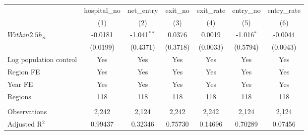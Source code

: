 \begingroup
\centering
\begin{tabular}{lcccccc}
   \toprule
                          & hospital\_no  & net\_entry    & exit\_no  & exit\_rate  & entry\_no    & entry\_rate \\    
                          & (1)           & (2)           & (3)       & (4)         & (5)          & (6)\\  
   \midrule 
   $Within2.5h_{it}$      & -0.0181       & -1.041$^{**}$ & 0.0376    & 0.0019      & -1.016$^{*}$ & -0.0044\\   
                          & (0.0199)      & (0.4371)      & (0.3718)  & (0.0033)    & (0.5794)     & (0.0043)\\   
   Log population control & Yes           & Yes           & Yes       & Yes         & Yes          & Yes\\  
   Region FE              & Yes           & Yes           & Yes       & Yes         & Yes          & Yes\\  
   Year FE                & Yes           & Yes           & Yes       & Yes         & Yes          & Yes\\  
   Regions                & 118           & 118           & 118       & 118         & 118          & 118\\  
    \\
   Observations           & 2,242         & 2,124         & 2,242     & 2,242       & 2,124        & 2,124\\  
   Adjusted R$^2$         & 0.99437       & 0.32346       & 0.75730   & 0.14696     & 0.70289      & 0.07456\\  
   \bottomrule
\end{tabular}
\par\endgroup
